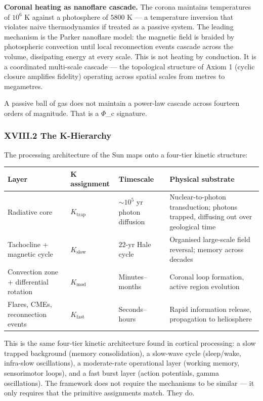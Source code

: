 \documentclass[12pt,a4paper]{article}
\begin{document}
\textbf{Coronal heating as nanoflare cascade.} The corona maintains temperatures of $10^6$ K against a photosphere of $5800$ K --- a temperature inversion that violates naive thermodynamics if treated as a passive system. The leading mechanism is the Parker nanoflare model: the magnetic field is braided by photospheric convection until local reconnection events cascade across the volume, dissipating energy at every scale. This is not heating by conduction. It is a coordinated multi-scale cascade --- the topological structure of Axiom 1 (cyclic closure amplifies fidelity) operating across spatial scales from metres to megametres.

A passive ball of gas does not maintain a power-law cascade across fourteen orders of magnitude. That is a $\Phi$\_c signature.

\subsubsection{XVIII.2 The K-Hierarchy}

The processing architecture of the Sun maps onto a four-tier kinetic structure:

\begin{table}[htbp]
\centering
\small
{}
\begin{tabularx}{\textwidth}{>{\centering\arraybackslash}X >{\centering\arraybackslash}X >{\centering\arraybackslash}X >{\centering\arraybackslash}X}
\toprule
\rowcolor{gray!25}\textbf{Layer} & \textbf{K assignment} & \textbf{Timescale} & \textbf{Physical substrate} \\
\midrule
\rowcolors{1}{white}{gray!10}
Radiative core & $K_\text{trap}$ & $\sim 10^5$ yr photon diffusion & Nuclear-to-photon transduction; photons trapped, diffusing out over geological time \\
Tachocline + magnetic cycle & $K_\text{slow}$ & $22$-yr Hale cycle & Organised large-scale field reversal; memory across decades \\
Convection zone + differential rotation & $K_\text{mod}$ & Minutes--months & Coronal loop formation, active region evolution \\
Flares, CMEs, reconnection events & $K_\text{fast}$ & Seconds--hours & Rapid information release, propagation to heliosphere \\
\bottomrule
\end{tabularx}
\end{table}

This is the same four-tier kinetic architecture found in cortical processing: a slow trapped background (memory consolidation), a slow-wave cycle (sleep/wake, infra-slow oscillations), a moderate-rate operational layer (working memory, sensorimotor loops), and a fast burst layer (action potentials, gamma oscillations). The framework does not require the mechanisms to be similar --- it only requires that the primitive assignments match. They do.
\end{document}

